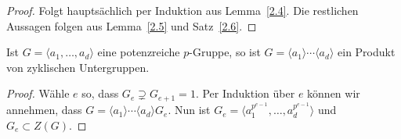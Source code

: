 \documentclass[11pt,a4paper,openany]{memoir}
\begin{document}
\begin{proof}
Folgt hauptsächlich per Induktion aus Lemma~\ref{2.4}. Die restlichen Aussagen folgen aus Lemma~\ref{2.5} und Satz~\ref{2.6}.
\end{proof}

\begin{corollary}\label{2.8}
Ist $G=\langle a_1,\ldots,a_d\rangle$ eine potenzreiche $p$-Gruppe, so ist $G=\langle a_1\rangle\cdots\langle a_d\rangle$ ein Produkt von zyklischen Untergruppen.
\end{corollary}

\begin{proof}
Wähle $e$ so, dass $G_e\supsetneq G_{e+1}=1$. Per Induktion über $e$ können wir annehmen, dass $G=\langle a_1\rangle\cdots\langle a_d\rangle G_e$. Nun ist $G_e=\langle a_1^{p^{e-1}},\ldots,a_d^{p^{e-1}}\rangle$ und $G_e\subset Z(G)$.
\end{proof}

\iffalse
\begin{theorem}\label{2.9}
Ist $G$ eine potenzreiche $p$-Gruppe und $H\subset G$ eine Untergruppe, so gilt: \[d(H)\leq d(G)\]
\end{theorem}

\begin{proof}
Per Induktion über $\#G$. Sei $d:=d(G)$ und setze $m:=d(G_2)$, wobei $G_i:=P_i(G)$. Nach Lemma~\ref{2.4} (i) ist $G_2$ potenzreich, d.h. nach der Induktionsvoraussetzung können wir annehmen, dass für $K:=H\cap G_2$ die Ungleichung $d(K)\leq m$ erfüllt.

Betrachte die nach Lemma~\ref{2.4} (ii) surjektive Abbildung $\pi:G/G_2\to G_2/G_3,\ x\mapsto x^p$ und es gilt $\dim_{\mathbb{F}_p}(\ker(\pi))=d-m$. Es folgt $\dim_{\mathbb{F}_p}(\ker(\pi)\cap HG_2/G_2)\leq d-m$, also:
\[\dim_{\mathbb{F}_p}(\pi (HG_2/G_2))\geq \dim_{\mathbb{F}_p}(HG_2/G_2)-(d-m)=m-(d-e) \]
wobei $e:=\dim_{\mathbb{F}_p}(HG_2/G_2)\leq d$. Sei $h_1,\ldots,h_e\in H$, so dass $HG_2=\langle h_1,\ldots,h_e\rangle G_2$. Da $\Phi(K)\subset K^p\subset G_3$ gilt, induziert $K\to KG_3/G_3$ die Surjektion $\phi:K/\Phi(K)\to KG_3/G_3$. Das Bild des $\mathbb{F}_p$"~Unterraums $V:=\langle\overline{h_1^p},\ldots,\overline{h_e^p}\rangle\subset K/\Phi(K)$ unter $\phi$ ist gerade $\pi(HG_2/G_2)$, daher ist $\dim_{\mathbb{F}_p}(V)\geq \dim_{\mathbb{F}_p}(\pi(HG_2/G_2))\geq m-(d-e)$. Da $d(K)\leq m$, können wir $y_1,\ldots,y_{d-e}\in K$ finden mit:
\[K=\langle h_1^p,\ldots,h_e^p,y_1,\ldots,y_{d-e}\rangle\Phi(K)=\langle h_1^p,\ldots,h_e^p,y_1,\ldots,y_{d-e}\rangle \]
Somit folgt $H=H\cap\langle h_1,\ldots,h_e\rangle G_2=\langle h_1,\ldots,h_e\rangle K=\langle h_1,\ldots,h_e,y_1,\ldots,y_{d-e}\rangle$ und daher $d(H)\leq d$.
\end{proof}
\fi
\end{document}
